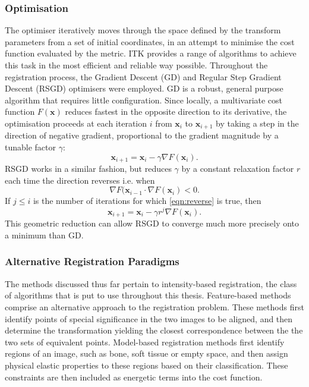     \subsubsection{Optimisation} %
    \label{ssub:optimisation}
    The optimiser iteratively moves through the space defined by the transform parameters from a set of initial coordinates, in an attempt to minimise the cost function evaluated by the metric. ITK provides a range of algorithms to achieve this task in the most efficient and reliable way possible. Throughout the registration process, the Gradient Descent (GD) and Regular Step Gradient Descent (RSGD) optimisers were employed. GD is a robust, general purpose algorithm that requires little configuration. Since locally, a multivariate cost function $F(\mathbf{x})$ reduces fastest in the opposite direction to its derivative, the optimisation proceeds at each iteration $i$ from $\mathbf{x}_i$ to $\mathbf{x}_{i+1}$ by taking a step in the direction of negative gradient, proportional to the gradient magnitude by a tunable factor $\gamma$:
      \begin{equation}
        \mathbf{x}_{i+1} = \mathbf{x}_{i} - \gamma \nabla F(\mathbf{x}_{i}).
      \end{equation}
      RSGD works in a similar fashion, but reduces $\gamma$ by a constant relaxation factor $r$ each time the direction reverses i.e. when
      \begin{equation}
        \nabla F(\mathbf{x}_{i-1} \cdot \nabla F(\mathbf{x}_{i}) < 0.
        \label{eqn:reverse}
      \end{equation}
      If $j \le i$ is the number of iterations for which \ref{eqn:reverse} is true, then
      \begin{equation}
        \mathbf{x}_{i+1} = \mathbf{x}_{i} - \gamma r^j \nabla F(\mathbf{x}_{i}).
      \end{equation}
      This geometric reduction can allow RSGD to converge much more precisely onto a minimum than GD.
    
    \subsubsection{Alternative Registration Paradigms} %
    \label{ssub:alternative_registration_paradigms}
      The methods discussed thus far pertain to intensity-based registration, the class of algorithms that is put to use throughout this thesis. Feature-based methods comprise an alternative approach to the registration problem. These methods first identify points of special significance in the two images to be aligned, and then determine the transformation yielding the closest correspondence between the the two sets of equivalent points. Model-based registration methods first identify regions of an image, such as bone, soft tissue or empty space, and then assign physical elastic properties to these regions based on their classification. These constraints are then included as energetic terms into the cost function.
  
